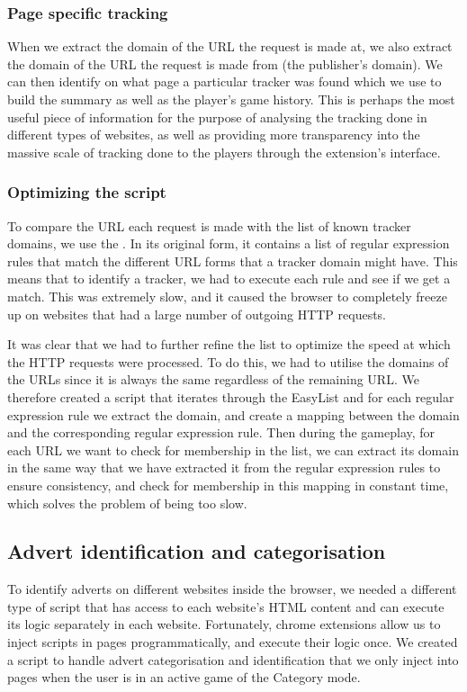 \documentclass{l4proj}
\begin{document}
\subsubsection{Page specific tracking}
When we extract the domain of the URL the request is made at, we also extract the domain of the URL the request is made from (the publisher's domain). We can then identify on what page a particular tracker was found which we use to build the summary as well as the player's game history. This is perhaps the most useful piece of information for the purpose of analysing the tracking done in different types of websites, as well as providing more transparency into the massive scale of tracking done to the players through the extension's interface.

\subsubsection{Optimizing the script}
To compare the URL each request is made with the list of known tracker domains, we use the \cite{easylist}. In its original form, it contains a list of regular expression rules that match the different URL forms that a tracker domain might have. This means that to identify a tracker, we had to execute each rule and see if we get a match. This was extremely slow, and it caused the browser to completely freeze up on websites that had a large number of outgoing HTTP requests.

It was clear that we had to further refine the list to optimize the speed at which the HTTP requests were processed. To do this, we had to utilise the domains of the URLs since it is always the same regardless of the remaining URL. We therefore created a script that iterates through the EasyList and for each regular expression rule we extract the domain, and create a mapping between the domain and the corresponding regular expression rule. Then during the gameplay, for each URL we want to check for membership in the list, we can extract its domain in the same way that we have extracted it from the regular expression rules to ensure consistency, and check for membership in this mapping in constant time, which solves the problem of being too slow.

\subsection{Advert identification and categorisation}
To identify adverts on different websites inside the browser, we needed a different type of script that has access to each website's HTML content and can execute its logic separately in each website. Fortunately, chrome extensions allow us to inject scripts in pages programmatically, and execute their logic once. We created a script to handle advert categorisation and identification that we only inject into pages when the user is in an active game of the Category mode. 
\end{document}
